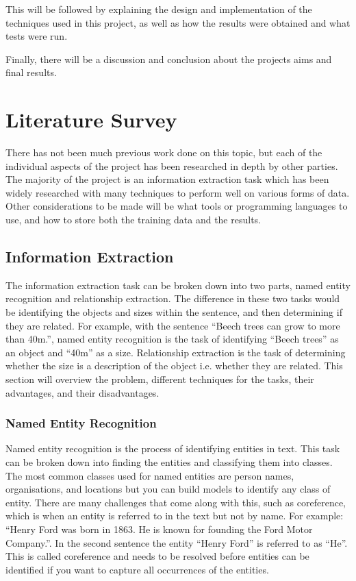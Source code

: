 \documentclass[11pt,oneside]{book}
\begin{document}
This will be followed by explaining the design and implementation of the techniques used in this project, as well as how the results were obtained and what tests were run.

Finally, there will be a discussion and conclusion about the projects aims and final results.


\chapter{Literature Survey}

There has not been much previous work done on this topic, but each of the individual aspects of the project has been researched in depth by other parties. The majority of the project is an information extraction task which has been widely researched with many techniques to perform well on various forms of data. Other considerations to be made will be what tools or programming languages to use, and how to store both the training data and the results.

\section{Information Extraction}
The information extraction task can be broken down into two parts, named entity recognition and relationship extraction. The difference in these two tasks would be identifying the objects and sizes within the sentence, and then determining if they are related. For example, with the sentence “Beech trees can grow to more than 40m.”, named entity recognition is the task of identifying “Beech trees” as an object and “40m” as a size. Relationship extraction is the task of determining whether the size is a description of the object i.e. whether they are related. This section will overview the problem, different techniques for the tasks, their advantages, and their disadvantages.

\subsection{Named Entity Recognition}

Named entity recognition is the process of identifying entities in text. This task can be broken down into finding the entities and classifying them into classes. The most common classes used for named entities are person names, organisations, and locations but you can build models to identify any class of entity. There are many challenges that come along with this, such as coreference, which is when an entity is referred to in the text but not by name. For example: “Henry Ford was born in 1863. He is known for founding the Ford Motor Company.”. In the second sentence the entity “Henry Ford” is referred to as “He”. This is called coreference and needs to be resolved before entities can be identified if you want to capture all occurrences of the entities.
\end{document}
